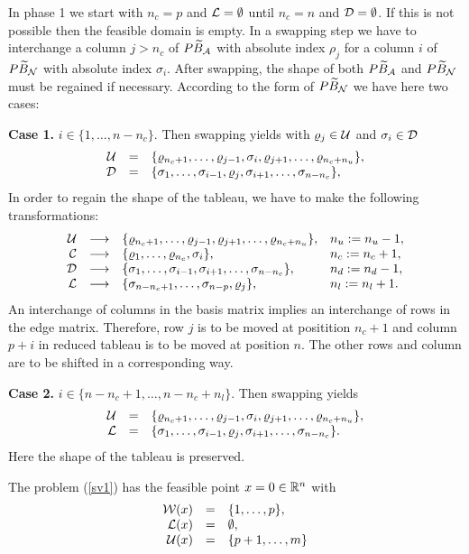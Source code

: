 \par
In phase 1 we start with $n_c = p$ and $\L = \emptyset$ until $n_c = n$ and $\D
= \emptyset$. If this is not possible then the feasible domain is empty. In a
swapping step we have to interchange a column $j > n_c$ of $P\wi{B}_{\A}$ with
absolute index $\rho _j$ for a column $i$ of $P\wi{B}_{\N}$ with absolute index
$\sigma _i$. After swapping, the shape of both $P\wi{B}_{\A}$ and
$P\wi{B}_{\N}$ must be regained if necessary. According to the form of
$P\wi{B}_{\N}$ we have here two cases:
\par
{\bf Case 1.} $i \in \{1, \ldots, n - n_c\}$. Then
swapping yields with $\rho _j \in \U$ and $\sigma _i \in \D$
\[
\ba{.}{rcl}
\U &=& \{\rho _{n_c+1}, \ldots, \rho _{j-1}, \sigma _i,\rho _{j+1}, \ldots,
\rho _{n_c+n_u} \},\\
\D &=& \{\sigma _1, \ldots, \sigma _{i-1}, \rho _j, \sigma _{i+1}, \ldots,
\sigma _{n-n_c}\},\\
\ea{.}
\]
In order to regain the shape of the tableau, we have to make the following
transformations:
\[
\ba{.}{rcll}
\U &\longrightarrow& \{\rho _{n_c+1}, \ldots, \rho _{j-1},\rho _{j+1}, \ldots,
\rho _{n_c+n_u} \}, &n_u := n_u - 1,\\
\C &\longrightarrow& \{\rho _1, \ldots, \rho _{n_c},\sigma _i\}, &n_c := n_c +
1,\\
\D &\longrightarrow& \{\sigma _1, \ldots, \sigma _{i-1}, \sigma _{i+1},
\ldots, \sigma _{n-n_c}\}, &n_d := n_d - 1,\\
\L &\longrightarrow& \{\sigma _{n-n_c+1},\ldots ,\sigma _{n-p},\rho
_j\}, &n_l := n_l + 1.\ea{.}
\]
An interchange of columns in the basis matrix implies an interchange of rows in
the edge matrix.  Therefore, row $j$ is to be moved at positition $n_c
+ 1$ and column $p + i$ in reduced tableau is to be moved at position $n$.  The
other rows and column are to be shifted in a corresponding way.
\par
{\bf Case 2.} $i \in \{n-n_c+1, \ldots, n - n_c + n_l\}$. Then
swapping yields
\[
\ba{.}{rcl}
\U &=& \{\rho _{n_c+1}, \ldots, \rho _{j-1},\sigma _i,\rho _{j+1},
\ldots, \rho _{n_c+n_u}\},\\
\L &=& \{\sigma _1, \ldots, \sigma _{i-1}, \rho _j, \sigma _{i+1}, \ldots,
\sigma _{n-n_c}\}.
\ea{.}
\]
Here the shape of the tableau is preserved.
\par
The problem (\ref{sv1}) has the feasible point $x = 0 \in \Bbb{R}^n$ with
\[
\ba{.}{rcl}
\W(x) &=& \{1, \ldots, p\},\\
\L(x) &=& \emptyset,\\
\U(x) &=& \{p+1, \ldots, m\}
\ea{.}
\]
